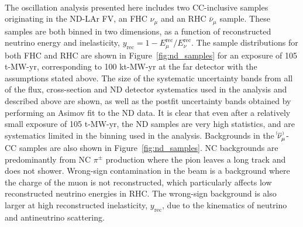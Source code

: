 \begin{figure*}
  \centering
  \\
  \caption{ND samples in both FHC and RHC, shown in the reconstructed neutrino energy and reconstructed inelasticity binning ($y_{\mathrm{rec}}$) used in the analysis, for a 105 t-MW-yr exposure (equivalent to a 100 kt-MW-yr exposure at the FD) with all relevant exposure assumptions including 57\% accelerator uptime as described in the text, with an equal split between FHC and RHC. The size of the systematic uncertainty bands from all of the flux, cross-section and ND detector systematics used in the analysis are shown, as well as the postfit uncertainty bands obtained by performing an Asimov fit to the ND data. NC backgrounds and wrong-sign contributions to the total event rate are also shown. Statistical uncertainties are too small to be visible on this plot scale.}
 \label{fig:nd_samples}
\end{figure*}
The oscillation analysis presented here includes two CC-inclusive samples originating in the ND-LAr FV, an FHC $\nu_{\mu}$ and an RHC $\bar{\nu}_{\mu}$ sample. These samples are both binned in two dimensions, as a function of reconstructed neutrino energy and inelasticity, $y_{\mathrm{rec}} = 1 - E^{\mathrm{rec}}_{\mu}/E^{\mathrm{rec}}_{\nu}$. The sample distributions for both FHC and RHC are shown in Figure~\ref{fig:nd_samples} for an exposure of 105 t-MW-yr, corresponding to 100 kt-MW-yr at the far detector with the assumptions stated above. The size of the systematic uncertainty bands from all of the flux, cross-section and ND detector systematics used in the analysis and described above are shown, as well as the postfit uncertainty bands obtained by performing an Asimov fit to the ND data. It is clear that even after a relatively small exposure of 105 t-MW-yr, the ND samples are very high statistics, and are systematics limited in the binning used in the analysis. Backgrounds in the $\nu^{\bracketbar}_{\mu}$-CC samples are also shown in Figure~\ref{fig:nd_samples}. NC backgrounds are predominantly from NC $\pi^{\pm}$ production where the pion leaves a long track and does not shower. Wrong-sign contamination in the beam is a background where the charge of the muon is not reconstructed, which particularly affects low reconstructed neutrino energies in RHC. The wrong-sign background is also larger at high reconstructed inelasticity, $y_{\mathrm{rec}}$, due to the kinematics of neutrino and antineutrino scattering.

